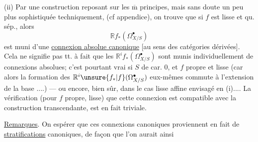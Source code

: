 (ii) Par une construction reposant  sur les $\overline{\mathrm m}$ principes, mais sans doute un peu plus sophistiquée techniquement, (cf appendice), on trouve que si $f$ est lisse  et qu. sép., alors
\[
\mathbb{R}f_*(\Omega^\bullet_{X/S})
\]
est muni d'une \uline{connexion absolue canonique} [au sens des catégories dérivées].
Cela ne signifie pas tt. à fait que les $\mathbb{R}^if_*(\Omega^\bullet_{X/S})$ sont munis individuellement de connexions absolues; c'est pourtant vrai si $S$ de car. 0, et $f$ propre et lisse (car alors la formation des $\mathbb{R}^i\unsure{f_*|f}(\Omega^\bullet_{X/S})$ eux-mêmes commute à l'extension de la base ....) --- ou encore, bien sûr, dans le cas lisse affine envisagé en (i)....
La vérification (pour $f$ propre, lisse) que cette connexion est compatible avec la construction transcendante, est en fait triviale.

\uline{Remarques}. On  espérer que ces connexions canoniques proviennent en fait de \uline{stratifications} canoniques, de façon que l'on aurait ainsi

